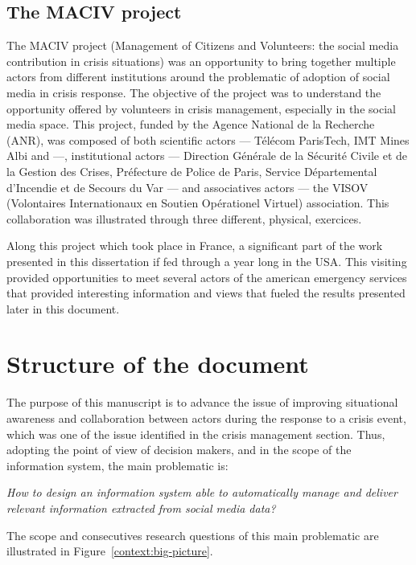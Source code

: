 \subsection{The MACIV project}
The MACIV project (Management of Citizens and Volunteers: the social media contribution in crisis situations)
was an opportunity to bring together multiple actors from different institutions around the problematic
of adoption of social media in crisis response.
The objective of the project was to understand the opportunity offered by volunteers in crisis management, especially in the social media space.
This project, funded by the Agence National de la Recherche (ANR), was composed of both
scientific actors — Télécom ParisTech, IMT Mines Albi and —,
institutional actors — Direction Générale de la Sécurité Civile et de la Gestion des Crises, Préfecture de Police de Paris, Service Départemental d'Incendie et de Secours du Var — and
associatives actors — the VISOV (Volontaires Internationaux en Soutien Opérationel Virtuel) association.
This collaboration was illustrated through three different, physical, exercices.

Along this project which took place in France, a significant part of the work presented in this dissertation if fed through a year long in the USA.
This visiting provided opportunities to meet several actors of the american emergency services that
provided interesting information and views that fueled the results presented later in this document.

\section{Structure of the document}
The purpose of this manuscript is to advance the issue of improving situational awareness and collaboration between actors during the response to a crisis event, which was one of the issue identified in the crisis management section.
Thus, adopting the point of view of decision makers, and in the scope of the information system, the main problematic is:

\emph{How to design an information system able to automatically manage and deliver relevant information extracted from social media data?}

The scope and consecutives research questions of this main problematic are illustrated in Figure~\ref{context:big-picture}.

